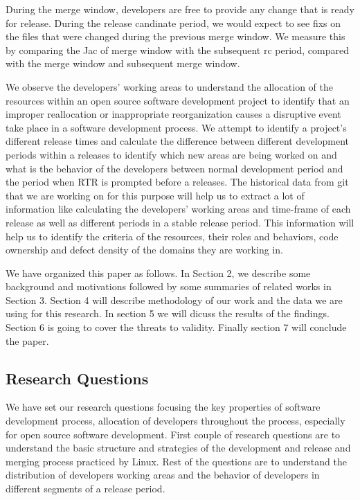 \documentclass{acm_proc_article-sp}
\begin{document}
During the merge window, developers are free to provide any change that is ready for release. During the release candinate period, we would expect to see fixs on the files that were changed during the previous merge window. We measure this by comparing the Jac of merge window with the subsequent rc period, compared with the merge window and subsequent merge window.

We observe the developers' working areas to understand the allocation of the resources within an open source software development project to identify that an improper reallocation or inappropriate reorganization causes a disruptive event take place in a software development process. We attempt to identify a project's different release times and calculate the difference between different development periods within a releases to identify which new areas are being worked on and what is the behavior of the developers between normal development period and the period when RTR is prompted before a releases. The historical data from git that we are working on for this purpose will help us to extract a lot of information like calculating the developers' working areas and time-frame of each release as well as different periods in a stable release period. This information will help us to identify the criteria of the resources, their roles and behaviors, code ownership and defect density of the domains they are working in.

We have organized this paper as follows. In Section 2, we describe some background and motivations followed by some summaries of related works in Section 3. Section 4 will describe methodology of our work and the data we are using for this research. In section 5 we will dicuss the results of the findings. Section 6 is going to cover the threats to validity. Finally section 7 will conclude the paper.

\subsection{Research Questions}
We have set our research questions focusing the key properties of software development process, allocation of developers throughout the process, especially for open source software development. First couple of research questions are to understand the basic structure and strategies of the development and release and merging process practiced by Linux. Rest of the questions are to understand the distribution of developers working areas and the behavior of developers in different segments of a release period.
\end{document}
